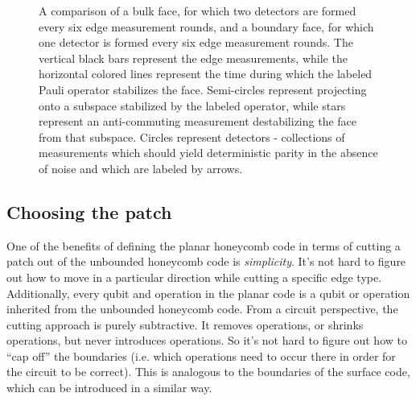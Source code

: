 \documentclass[onecolumn,unpublished,a4paper]{quantumarticle}
\theoremstyle{definition}
\theoremstyle{definition}
\theoremstyle{definition}
\begin{document}
\begin{figure}[ht!]
    \centering
    \caption{
    A comparison of a bulk face, for which two detectors are formed every six edge measurement rounds, and a boundary face, for which one detector is formed every six edge measurement rounds.  The vertical black bars represent the edge measurements, while the horizontal colored lines represent the time during which the labeled Pauli operator stabilizes the face.  Semi-circles represent projecting onto a subspace stabilized by the labeled operator, while stars represent an anti-commuting measurement destabilizing the face from that subspace.  Circles represent detectors - collections of measurements which should yield deterministic parity in the absence of noise and which are labeled by arrows.
    }
    \label{fig:detectors}
\end{figure}

\subsection{Choosing the patch}
\label{sec:patches}

One of the benefits of defining the planar honeycomb code in terms of cutting a patch out of the unbounded honeycomb code is \emph{simplicity}.  
It's not hard to figure out how to move in a particular direction while cutting a specific edge type.
Additionally, every qubit and operation in the planar code is a qubit or operation inherited from the unbounded honeycomb code.
From a circuit perspective, the cutting approach is purely subtractive.
It removes operations, or shrinks operations, but never introduces operations.
So it's not hard to figure out how to ``cap off'' the boundaries (i.e. which operations need to occur there in order for the circuit to be correct).
This is analogous to the boundaries of the surface code, which can be introduced in a similar way.
\end{document}
